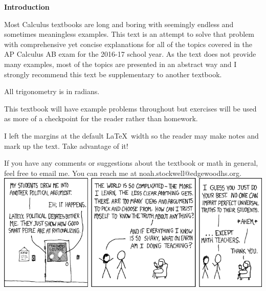\par \textbf{Introduction}
\newline
\vspace{0.125in}
\par Most Calculus textbooks are long and boring with seemingly endless and sometimes meaningless examples. This text is an attempt to solve that problem with comprehensive yet concise explanations for all of the topics covered in the AP Calculus AB exam for the 2016-17 school year. As the text does not provide many examples, most of the topics are presented in an abstract way and I strongly recommend this text be supplementary to another textbook.\\\par All trigonometry is in radians.\\\par This textbook will have example problems throughout but exercises will be used as more of a checkpoint for the reader rather than homework.\\\par I left the margins at the default \LaTeX\, width so the reader may make notes and mark up the text. Take advantage of it!\\\par If you have any comments or suggestions about the textbook or math in general, feel free to email me. You can reach me at noah.stockwell@edgewoodhs.org.
\vfill
\includegraphics[width=\textwidth]{teachers.png}
\vfill

